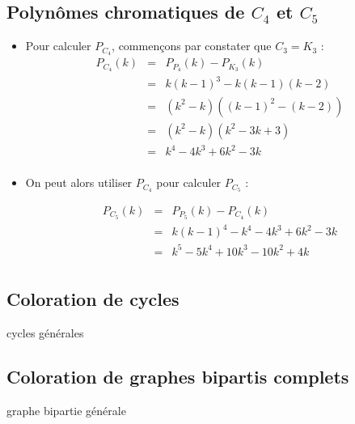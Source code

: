 \subsection{Polynômes chromatiques de $C_4$ et $C_5$}
\begin {itemize}
\item Pour calculer $P_{C_4}$, commençons par constater que $C_3 = K_3$ :
\begin{eqnarray*}
P_{C_4}(k)	& = &	P_{P_4}(k) - P_{K_3}(k)				\\
			& = & 	k(k-1)^3 - k(k-1)(k-2)				\\
			& = & 	(k^2 - k)((k-1)^2 - (k-2))			\\
			& = &	(k^2 - k)(k^2 - 3k + 3)				\\
			& = & 	k^4 - 4k^3 + 6k^2 - 3k				\\			
\end{eqnarray*}

\item On peut alors utiliser $P_{C_4}$ pour calculer $P_{C_5}$ :

\begin{eqnarray*}
P_{C_5}(k)	& = &	P_{P_5}(k) - P_{C_4}(k)				\\
			& = & 	k(k-1)^4 - k^4 -4k^3 + 6k^2 - 3k	\\
			& = &	k^5 - 5k^4 + 10k^3 - 10k^2 + 4k		\\ 
\end{eqnarray*}

\end {itemize}

\subsection{Coloration de cycles}
cycles générales

\subsection{Coloration de graphes bipartis complets}
graphe bipartie générale
